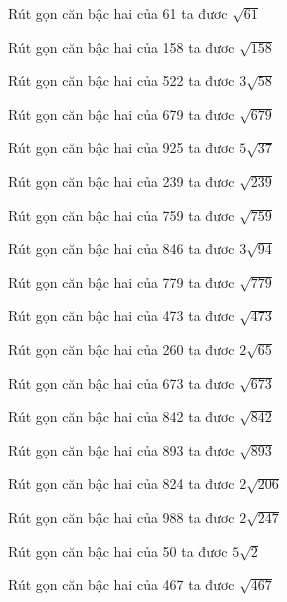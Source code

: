 \documentclass[12pt,a4paper]{article}
\begin{document}
\begin{ex}
Rút gọn căn bậc hai của 61 ta đươc $\sqrt{61}$
\end{ex}
\begin{ex}
Rút gọn căn bậc hai của 158 ta đươc $\sqrt{158}$
\end{ex}
\begin{ex}
Rút gọn căn bậc hai của 522 ta đươc $3\sqrt{58}$
\end{ex}
\begin{ex}
Rút gọn căn bậc hai của 679 ta đươc $\sqrt{679}$
\end{ex}
\begin{ex}
Rút gọn căn bậc hai của 925 ta đươc $5\sqrt{37}$
\end{ex}
\begin{ex}
Rút gọn căn bậc hai của 239 ta đươc $\sqrt{239}$
\end{ex}
\begin{ex}
Rút gọn căn bậc hai của 759 ta đươc $\sqrt{759}$
\end{ex}
\begin{ex}
Rút gọn căn bậc hai của 846 ta đươc $3\sqrt{94}$
\end{ex}
\begin{ex}
Rút gọn căn bậc hai của 779 ta đươc $\sqrt{779}$
\end{ex}
\begin{ex}
Rút gọn căn bậc hai của 473 ta đươc $\sqrt{473}$
\end{ex}
\begin{ex}
Rút gọn căn bậc hai của 260 ta đươc $2\sqrt{65}$
\end{ex}
\begin{ex}
Rút gọn căn bậc hai của 673 ta đươc $\sqrt{673}$
\end{ex}
\begin{ex}
Rút gọn căn bậc hai của 842 ta đươc $\sqrt{842}$
\end{ex}
\begin{ex}
Rút gọn căn bậc hai của 893 ta đươc $\sqrt{893}$
\end{ex}
\begin{ex}
Rút gọn căn bậc hai của 824 ta đươc $2\sqrt{206}$
\end{ex}
\begin{ex}
Rút gọn căn bậc hai của 988 ta đươc $2\sqrt{247}$
\end{ex}
\begin{ex}
Rút gọn căn bậc hai của 50 ta đươc $5\sqrt{2}$
\end{ex}
\begin{ex}
Rút gọn căn bậc hai của 467 ta đươc $\sqrt{467}$
\end{ex}
\end{document}
